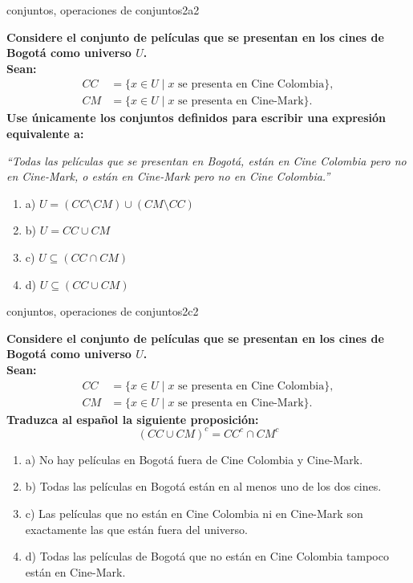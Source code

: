 \documentclass{article}
\begin{document}
\begin{question}{18}{conjuntos, operaciones de conjuntos}{2}{a}{2}{
\textbf{Considere el conjunto de películas que se presentan en los cines de Bogotá como universo \(U\).}\\
\textbf{Sean:}
\[
\begin{aligned}
CC &= \{x \in U \mid x\text{ se presenta en Cine Colombia}\},\\
CM &= \{x \in U \mid x\text{ se presenta en Cine-Mark}\}.
\end{aligned}
\]
\textbf{Use únicamente los conjuntos definidos para escribir una expresión equivalente a:} \smallskip

\textit{“Todas las películas que se presentan en Bogotá, están en Cine Colombia pero no en Cine-Mark, o están en Cine-Mark pero no en Cine Colombia.”} \smallskip

\begin{enumerate}
    \item a) \( U = (CC \setminus CM) \cup (CM \setminus CC) \)  
    \item b) \( U = CC \cup CM \)  
    \item c) \( U \subseteq (CC \cap CM) \)  
    \item d) \( U \subseteq (CC \cup CM) \)  
\end{enumerate}
}
\end{question}

\begin{question}{19}{conjuntos, operaciones de conjuntos}{2}{c}{2}{
\textbf{Considere el conjunto de películas que se presentan en los cines de Bogotá como universo \(U\).}\\
\textbf{Sean:}
\[
\begin{aligned}
CC &= \{x \in U \mid x\text{ se presenta en Cine Colombia}\},\\
CM &= \{x \in U \mid x\text{ se presenta en Cine-Mark}\}.
\end{aligned}
\]
\textbf{Traduzca al español la siguiente proposición:}
\[
(CC \cup CM)^c = CC^c \cap CM^c
\]

\begin{enumerate}
    \item a) No hay películas en Bogotá fuera de Cine Colombia y Cine-Mark.  
    \item b) Todas las películas en Bogotá están en al menos uno de los dos cines.  
    \item c) Las películas que no están en Cine Colombia ni en Cine-Mark son exactamente las que están fuera del universo.  
    \item d) Todas las películas de Bogotá que no están en Cine Colombia tampoco están en Cine-Mark.  
\end{enumerate}
}
\end{question}
\end{document}
